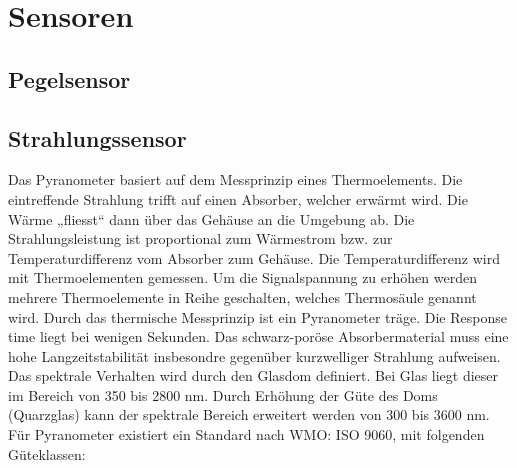 \section{Sensoren}


\subsection{Pegelsensor}


\subsection{Strahlungssensor}


Das Pyranometer basiert auf dem Messprinzip eines Thermoelements. Die eintreffende Strahlung trifft auf einen Absorber, welcher erwärmt wird. Die Wärme „fliesst“ dann über das Gehäuse an die Umgebung ab. Die Strahlungsleistung ist proportional zum Wärmestrom bzw. zur Temperaturdifferenz vom Absorber zum Gehäuse. Die Temperaturdifferenz wird mit Thermoelementen gemessen. Um die Signalspannung zu erhöhen werden mehrere Thermoelemente in Reihe geschalten, welches Thermosäule genannt wird. Durch das thermische Messprinzip ist ein Pyranometer träge. Die Response time liegt bei wenigen Sekunden. Das schwarz-poröse Absorbermaterial muss eine hohe Langzeitstabilität insbesondre gegenüber kurzwelliger Strahlung aufweisen. Das spektrale Verhalten wird durch den Glasdom definiert. Bei Glas liegt dieser im Bereich von 350 bis 2800 nm. Durch Erhöhung der Güte des Doms (Quarzglas) kann der spektrale Bereich erweitert werden von 300 bis 3600 nm. Für Pyranometer existiert ein Standard nach WMO: ISO 9060, mit folgenden Güteklassen:

